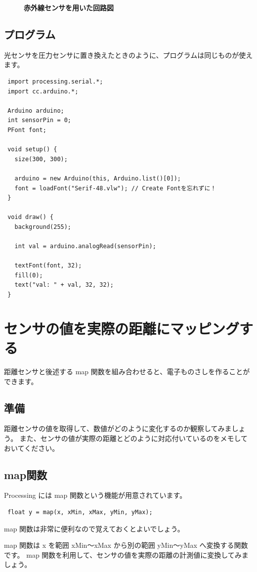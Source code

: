\documentclass[11pt,a4paper]{jarticle}
\begin{document}
\begin{figure}[h!]
\begin{minipage}{0.5\columnwidth}
  \begin{center}
   \textbf{赤外線センサを用いた回路図}
  \end{center}
 \end{minipage}
\end{figure}


\subsection*{プログラム}
光センサを圧力センサに置き換えたときのように、プログラムは同じものが使えます。
\begin{lstlisting}
 import processing.serial.*;
 import cc.arduino.*;
 
 Arduino arduino;
 int sensorPin = 0;
 PFont font;
 
 void setup() {
   size(300, 300);

   arduino = new Arduino(this, Arduino.list()[0]); 
   font = loadFont("Serif-48.vlw"); // Create Fontを忘れずに！
 }

 void draw() {
   background(255);

   int val = arduino.analogRead(sensorPin);

   textFont(font, 32);
   fill(0);
   text("val: " + val, 32, 32);
 }
\end{lstlisting}


\section{センサの値を実際の距離にマッピングする}
距離センサと後述する map 関数を組み合わせると、電子ものさしを作ることができます。

\subsection*{準備}
距離センサの値を取得して、数値がどのように変化するのか観察してみましょう。
また、センサの値が実際の距離とどのように対応付いているのをメモしておいてください。

\subsection*{map関数}
Processing には map 関数という機能が用意されています。
\begin{lstlisting}
 float y = map(x, xMin, xMax, yMin, yMax);
\end{lstlisting}
map 関数は非常に便利なので覚えておくとよいでしょう。

map 関数は x を範囲 xMin〜xMax から別の範囲 yMin〜yMax へ変換する関数です。
map 関数を利用して、センサの値を実際の距離の計測値に変換してみましょう。
\end{document}
